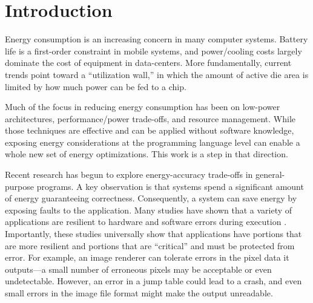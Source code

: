 

\section{Introduction}



Energy consumption is an increasing concern in many computer systems.
Battery life is a first-order constraint in mobile systems, and
power/cooling costs largely dominate the cost of equipment in
data-centers. More fundamentally, current trends point toward a
``utilization wall,'' in which the amount of active die area is
limited by how much power can be fed to a chip.



Much of the focus in reducing energy consumption has been
on low-power architectures, performance/power trade-offs, and resource
management. While those techniques are effective and can be applied
without software knowledge, exposing energy considerations at the programming
language level can enable a whole new set of energy
optimizations. This work is a step in that direction.

Recent research has begun to explore energy-accuracy trade-offs in
general-purpose programs. A key observation is that systems spend a
significant amount of energy guaranteeing correctness. Consequently, a
system can save energy by exposing faults to the application.
Many studies have shown that a variety of applications are resilient
to hardware and software errors during execution
  \cite{li07, ersa, softcomputing,
  dekruijf-selse09, flikker, qosprof, relax, wong-selse06,
  perforationtr, rinard-onward}. Importantly, these studies
universally show that applications have portions that are more
resilient and portions that are ``critical'' and must be protected
from error.
For example, an image renderer can tolerate errors in the pixel
data it outputs---a small number of erroneous pixels may be acceptable
or even undetectable. However, an error in a jump table could lead to
a crash, and even small errors in the image file format might make the
output unreadable.


